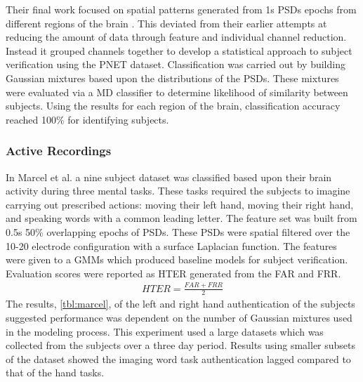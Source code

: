 Their final work focused on spatial patterns generated from 1s \acp{PSD} epochs from different regions of the brain \cite{Rocca2014}. This deviated from their earlier attempts at reducing the amount of data through feature and individual channel reduction. Instead it grouped channels together to develop a statistical approach to subject verification using the \ac{PNET} dataset. Classification was carried out by building Gaussian mixtures based upon the distributions of the \acp{PSD}. These mixtures were evaluated via a \ac{MD} classifier to determine likelihood of similarity between subjects. Using the results for each region of the brain, classification accuracy reached 100\% for identifying subjects.

\subsubsection{Active Recordings}

In Marcel et al.\cite{Marcel2007a} a nine subject dataset was classified based upon their brain activity during three mental tasks. These tasks required the subjects to imagine carrying out prescribed actions: moving their left hand, moving their right hand, and speaking words with a common leading letter. The feature set was built from 0.5s 50\% overlapping epochs of \acp{PSD}. These \acp{PSD} were spatial filtered over the 10-20 electrode configuration with a surface Laplacian function. The features were given to a \acp{GMM} which produced baseline models for subject verification. Evaluation scores were reported as \ac{HTER} generated from the \ac{FAR} and \ac{FRR}.
\begin{gather}
HTER = \frac{FAR + FRR}{2}
\end{gather}
The results, \cref{tbl:marcel}, of the left and right hand authentication of the subjects suggested performance was dependent on the number of Gaussian mixtures used in the modeling process. This experiment used a large datasets which was collected from the subjects over a three day period. Results using smaller subsets of the dataset showed the imaging word task authentication lagged compared to that of the hand tasks.

